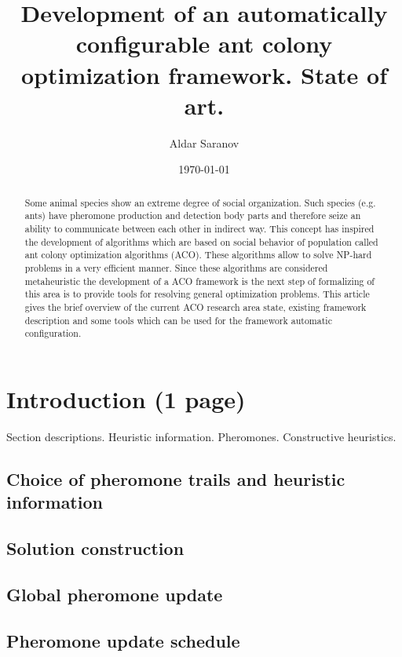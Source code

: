 \documentclass[12pt]{article}
\author{Aldar Saranov}
\date{\today}
\title{Development of an automatically configurable ant colony optimization framework. State of art.}
\begin{document}
\maketitle 
\newpage

\tableofcontents
\newpage

\begin{abstract}
Some animal species show an extreme degree of social organization. Such species (e.g. ants) have pheromone production and detection body parts and therefore seize an ability to communicate between each other in indirect way. This concept has inspired the development of algorithms which are based on social behavior of population called ant colony optimization algorithms (ACO). These algorithms allow to solve NP-hard problems in a very efficient manner. Since these algorithms are considered metaheuristic the development of a ACO framework is the next step of formalizing of this area is to provide tools for resolving general optimization problems. This article gives the brief overview of the current ACO research area state, existing framework description and some tools which can be used for the framework automatic configuration.
\end{abstract}



\section{Introduction (1 page)}
Section descriptions.
Heuristic information.
Pheromones.
Constructive heuristics.




\subsection{Choice of pheromone trails and heuristic information}

\subsection{Solution construction}

\subsection{Global pheromone update}

\subsection{Pheromone update schedule}
\end{document}
